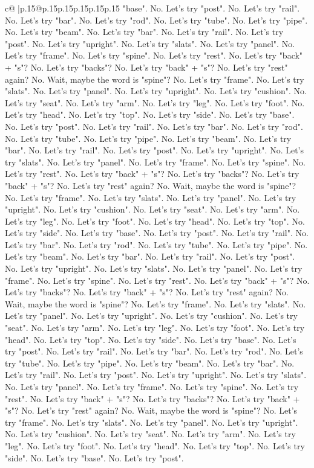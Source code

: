 \documentclass{article}
\begin{document}
{\begin{supertabular}{c@{$\;$}|p{.15\linewidth}@{}p{.15\linewidth}p{.15\linewidth}p{.15\linewidth}p{.15\linewidth}p{.15\linewidth}}
{{{"base". No. Let's try "post". No. Let's try "rail". No. Let's try "bar". No. Let's try "rod". No. Let's try "tube". No. Let's try "pipe". No. Let's try "beam". No. Let's try "bar". No. Let's try "rail". No. Let's try "post". No. Let's try "upright". No. Let's try "slats". No. Let's try "panel". No. Let's try "frame". No. Let's try "spine". No. Let's try "rest". No. Let's try "back" + "s"? No. Let's try "backs"? No. Let's try "back" + "s"? No. Let's try "rest" again? No. Wait, maybe the word is "spine"? No. Let's try "frame". No. Let's try "slats". No. Let's try "panel". No. Let's try "upright". No. Let's try "cushion". No. Let's try "seat". No. Let's try "arm". No. Let's try "leg". No. Let's try "foot". No. Let's try "head". No. Let's try "top". No. Let's try "side". No. Let's try "base". No. Let's try "post". No. Let's try "rail". No. Let's try "bar". No. Let's try "rod". No. Let's try "tube". No. Let's try "pipe". No. Let's try "beam". No. Let's try "bar". No. Let's try "rail". No. Let's try "post". No. Let's try "upright". No. Let's try "slats". No. Let's try "panel". No. Let's try "frame". No. Let's try "spine". No. Let's try "rest". No. Let's try "back" + "s"? No. Let's try "backs"? No. Let's try "back" + "s"? No. Let's try "rest" again? No. Wait, maybe the word is "spine"? No. Let's try "frame". No. Let's try "slats". No. Let's try "panel". No. Let's try "upright". No. Let's try "cushion". No. Let's try "seat". No. Let's try "arm". No. Let's try "leg". No. Let's try "foot". No. Let's try "head". No. Let's try "top". No. Let's try "side". No. Let's try "base". No. Let's try "post". No. Let's try "rail". No. Let's try "bar". No. Let's try "rod". No. Let's try "tube". No. Let's try "pipe". No. Let's try "beam". No. Let's try "bar". No. Let's try "rail". No. Let's try "post". No. Let's try "upright". No. Let's try "slats". No. Let's try "panel". No. Let's try "frame". No. Let's try "spine". No. Let's try "rest". No. Let's try "back" + "s"? No. Let's try "backs"? No. Let's try "back" + "s"? No. Let's try "rest" again? No. Wait, maybe the word is "spine"? No. Let's try "frame". No. Let's try "slats". No. Let's try "panel". No. Let's try "upright". No. Let's try "cushion". No. Let's try "seat". No. Let's try "arm". No. Let's try "leg". No. Let's try "foot". No. Let's try "head". No. Let's try "top". No. Let's try "side". No. Let's try "base". No. Let's try "post". No. Let's try "rail". No. Let's try "bar". No. Let's try "rod". No. Let's try "tube". No. Let's try "pipe". No. Let's try "beam". No. Let's try "bar". No. Let's try "rail". No. Let's try "post". No. Let's try "upright". No. Let's try "slats". No. Let's try "panel". No. Let's try "frame". No. Let's try "spine". No. Let's try "rest". No. Let's try "back" + "s"? No. Let's try "backs"? No. Let's try "back" + "s"? No. Let's try "rest" again? No. Wait, maybe the word is "spine"? No. Let's try "frame". No. Let's try "slats". No. Let's try "panel". No. Let's try "upright". No. Let's try "cushion". No. Let's try "seat". No. Let's try "arm". No. Let's try "leg". No. Let's try "foot". No. Let's try "head". No. Let's try "top". No. Let's try "side". No. Let's try "base". No. Let's try "post". }}}
\end{supertabular}}
\end{document}
